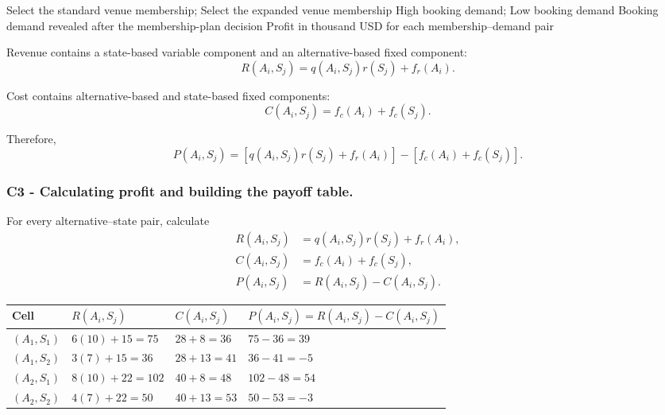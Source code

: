 \DecisionElementsTable
{Select the standard venue membership; Select the expanded venue membership}
{High booking demand; Low booking demand}
{Booking demand revealed after the membership-plan decision}
{Profit in thousand USD for each membership--demand pair}

Revenue contains a state-based variable component and an alternative-based
fixed component:
\[
R(A_i,S_j)
=
q(A_i,S_j)r(S_j)+f_r(A_i).
\]

Cost contains alternative-based and state-based fixed components:
\[
C(A_i,S_j)
=
f_c(A_i)+f_c(S_j).
\]

Therefore,
\[
P(A_i,S_j)
=
\left[
q(A_i,S_j)r(S_j)+f_r(A_i)
\right]
-
\left[
f_c(A_i)+f_c(S_j)
\right].
\]


\subsubsection*{C3 - Calculating profit and building the payoff table.}
\label{subsec:problem12-community-venue-membership-c3}

For every alternative--state pair, calculate
\[
\begin{aligned}
	R(A_i,S_j)
	&=
	q(A_i,S_j)r(S_j)+f_r(A_i),
	\\
	C(A_i,S_j)
	&=
	f_c(A_i)+f_c(S_j),
	\\
	P(A_i,S_j)
	&=
	R(A_i,S_j)-C(A_i,S_j).
\end{aligned}
\]

\begin{center}
	\small
	\begin{tabular}{llll}
		\toprule
		Cell
		& \(R(A_i,S_j)\)
		& \(C(A_i,S_j)\)
		& \(P(A_i,S_j)=R(A_i,S_j)-C(A_i,S_j)\) \\
		\midrule
		\((A_1,S_1)\)
		& \(6(10)+15=75\)
		& \(28+8=36\)
		& \(75-36=39\) \\
		
		\((A_1,S_2)\)
		& \(3(7)+15=36\)
		& \(28+13=41\)
		& \(36-41=-5\) \\
		
		\((A_2,S_1)\)
		& \(8(10)+22=102\)
		& \(40+8=48\)
		& \(102-48=54\) \\
		
		\((A_2,S_2)\)
		& \(4(7)+22=50\)
		& \(40+13=53\)
		& \(50-53=-3\) \\
		\bottomrule
	\end{tabular}
\end{center}

